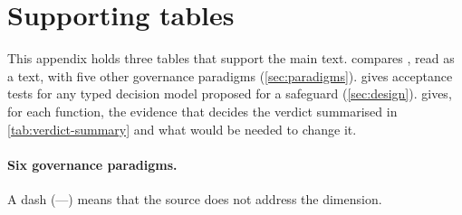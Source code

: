 \section{Supporting tables}\label{app:D}

This appendix holds three tables that support the main text.  compares \pol{}, read as a text, with five other governance paradigms (\cref{sec:paradigms}).  gives acceptance tests for any typed decision model proposed for a safeguard (\cref{sec:design}).  gives, for each \pol{} function, the evidence that decides the verdict summarised in \cref{tab:verdict-summary} and what would be needed to change it.

\begingroup
\footnotesize
\setlength{\tabcolsep}{3pt}
\newcommand{\rg}{\raggedright\arraybackslash\hspace{0pt}}
\newcommand{\dw}{\dimexpr\linewidth-16\tabcolsep\relax}

\paragraph{Six governance paradigms.}
A dash (---) means that the source does not address the dimension.

